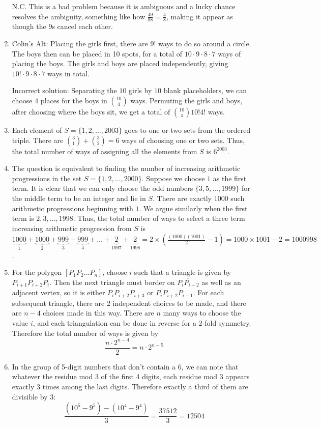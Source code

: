 \documentclass{book}
\numberwithin{equation}{section}
\begin{document}
\begin{enumerate}[label={1.\arabic*}]
N.C. This is a bad problem because it is ambiguous and a lucky chance
resolves the ambiguity, something like how $\frac{49}{98} = \frac{4}{8}$,
making it appear as though the $9$s cancel each other.

\item
Colin's Alt: Placing the girls first, there are $9!$ ways to do so around
a circle. The boys then can be placed in 10 spots, for a total of $10 \cdot
9 \cdot 8 \cdot 7$ ways of placing the boys. The girls and boys are placed
independently, giving $10! \cdot 9 \cdot 8 \cdot 7$ ways in total.

Incorrect solution:
Separating the $10$ girls by $10$ blank placeholders, we can choose $4$
places for the boys in $10 \choose 4$ ways. Permuting the girls and
boys, after choosing where the boys sit, we get a total of
${10\choose4}10!4!$ ways.

\item
Each element of $S=\{1, 2, \dots, 2003\}$ goes to one or two sets from
the ordered triple. There are ${3 \choose 1} + {3 \choose 2} = 6$ ways
of choosing one or two sets.
Thus, the total number of ways of assigning all the
elements from $S$ is $6^{2003}$.

\item
The question is equivalent to finding the number of increasing
arithmetic progressions in the set $S=\{1, 2, \dots, 2000\}$.  Suppose
we choose $1$ as the first term. It is clear that we can only choose the
odd numbers $\{3, 5, \dots, 1999\}$ for the middle term to be an integer
and lie in $S$.  There are exactly $1000$ such arithmetic progressions
beginning with $1$.  We argue similarly when the first term is $2, 3,
\dots, 1998$. Thus, the total number of ways to select a three term
increasing arithmetic progression from $S$ is $\underbrace{1000}_{1} +
\underbrace{1000}_{2} + \underbrace{999}_{3} + \underbrace{999}_{4} +
\dots + \underbrace{2}_{1997} + \underbrace{2}_{1998} =
2\times\left(\frac{(1000)(1001)}{2}-1\right) = 1000\times1001-2 =
1000998$.

\item
For the polygon $[P_1 P_2 \dots P_n]$, choose $i$ such that a triangle
is given by $P_{i+1} P_{i+2} P_i$. Then the next triangle must border on
$\overline{P_i P_{i+2}}$ as well as an adjacent vertex, so it is either
$P_i P_{i+2} P_{i+3}$ or $P_i P_{i+2} P_{i-1}$. For each subsequent triangle, there are 2 independent choices to be made, and there are $n - 4$ choices
made in this way. There are $n$ many ways to choose the value $i$, and each
triangulation can be done in reverse for a 2-fold symmetry. Therefore the
total number of ways is given by
$$\frac{n \cdot 2^{n-4}}{2} = n \cdot 2^{n - 5}$$

\item
In the group of 5-digit numbers that don't contain a 6, we can note that
whatever the residue mod 3 of the first 4 digits, each residue mod 3 appears
exactly 3 times among the last digits. Therefore exactly a third of them are
divisible by 3:
$$\frac{(10^5 - 9^5) - (10^4 - 9^4)}{3} = \frac{37512}{3} = 12504$$
\end{enumerate}
\end{document}
